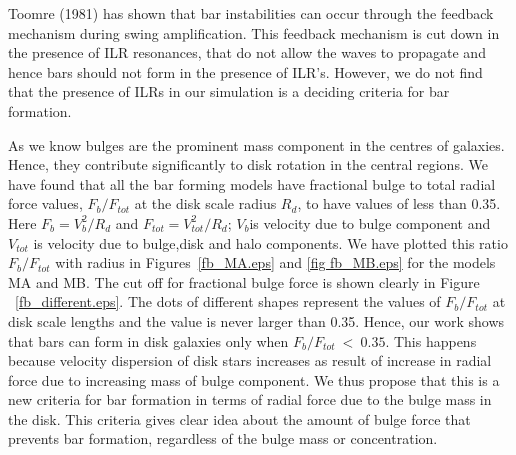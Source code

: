 \documentclass[a4paper,fleqn,usenatbib,useAMS]{mnras}
\begin{document}
Toomre (1981) has shown that bar instabilities can occur
through the feedback mechanism during swing amplification. This
feedback mechanism is cut down in the presence of ILR resonances, that do not allow the waves to propagate and hence bars should not form in the presence of ILR's. However, we do not find that the presence of ILRs in our simulation is a deciding criteria for bar formation.

As we know bulges are the prominent mass component in the centres
of galaxies. Hence, they contribute significantly to disk rotation in the central regions. We have found that all the bar forming models have fractional bulge to total radial force values, $F_{b}/F_{tot}$ at the disk scale radius $R_d$, to have values of less than 0.35. Here $F_{b}=V^2_{b}/R_d$ and $F_{tot}=V^2_{tot}/R_d$; $V_{b}$is velocity due to bulge component and $V_{tot}$ is velocity due to bulge,disk and halo components. We have plotted this ratio $F_{b}/F_{tot}$ with radius in Figures~\ref{fb_MA.eps} and \ref{fig fb_MB.eps} for the models MA and MB. The cut off for fractional bulge force is shown clearly in Figure ~\ref{fb_different.eps}. The dots of different shapes represent the values of $F_{b}/F_{tot}$ at disk scale lengths and the value is never larger than 0.35. Hence, our work shows that bars can form in disk galaxies only when $F_{b}/F_{tot}~<~0.35$. This happens because velocity dispersion of disk stars increases as result of increase in radial force due to increasing mass of bulge component. We thus propose that this is a new criteria for bar formation in terms of radial force due to the bulge mass in the disk. This criteria gives clear idea about the amount of bulge force that prevents bar formation, regardless of the bulge mass or concentration.
\end{document}
